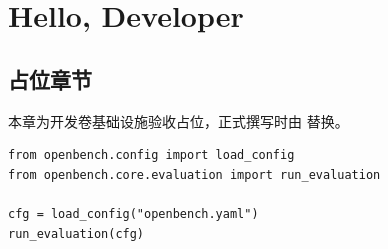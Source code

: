 \chapter{Hello, Developer}

\section{占位章节}

本章为开发卷基础设施验收占位，正式撰写时由  替换。


\begin{verbatim}
from openbench.config import load_config
from openbench.core.evaluation import run_evaluation

cfg = load_config("openbench.yaml")
run_evaluation(cfg)
\end{verbatim}
